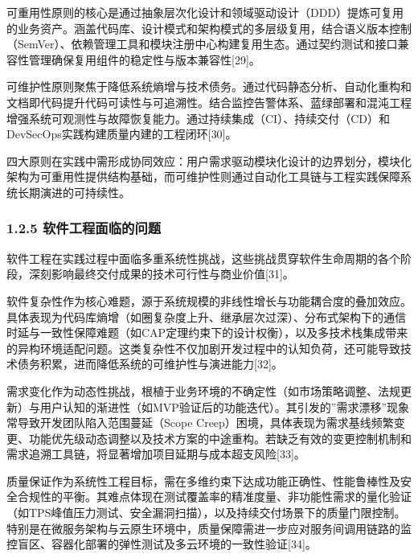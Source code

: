 可重用性原则的核心是通过抽象层次化设计和领域驱动设计（DDD）提炼可复用的业务资产。涵盖代码库、设计模式和架构模式的多层级复用，结合语义版本控制（SemVer）、依赖管理工具和模块注册中心构建复用生态。通过契约测试和接口兼容性管理确保复用组件的稳定性与版本兼容性{[}29{]}。


可维护性原则聚焦于降低系统熵增与技术债务。通过代码静态分析、自动化重构和文档即代码提升代码可读性与可追溯性。结合监控告警体系、蓝绿部署和混沌工程增强系统可观测性与故障恢复能力。通过持续集成（CI）、持续交付（CD）和DevSecOps实践构建质量内建的工程闭环{[}30{]}。

四大原则在实践中需形成协同效应：用户需求驱动模块化设计的边界划分，模块化架构为可重用性提供结构基础，而可维护性则通过自动化工具链与工程实践保障系统长期演进的可持续性。

\hypertarget{ux8f6fux4ef6ux5de5ux7a0bux9762ux4e34ux7684ux95eeux9898}{%
\subsubsection{1.2.5 软件工程面临的问题}\label{ux8f6fux4ef6ux5de5ux7a0bux9762ux4e34ux7684ux95eeux9898}}

软件工程在实践过程中面临多重系统性挑战，这些挑战贯穿软件生命周期的各个阶段，深刻影响最终交付成果的技术可行性与商业价值{[}31{]}。


软件复杂性作为核心难题，源于系统规模的非线性增长与功能耦合度的叠加效应。具体表现为代码库熵增（如圈复杂度上升、继承层次过深）、分布式架构下的通信时延与一致性保障难题（如CAP定理约束下的设计权衡），以及多技术栈集成带来的异构环境适配问题。这类复杂性不仅加剧开发过程中的认知负荷，还可能导致技术债务积累，进而降低系统的可维护性与演进能力{[}32{]}。


需求变化作为动态性挑战，根植于业务环境的不确定性（如市场策略调整、法规更新）与用户认知的渐进性（如MVP验证后的功能迭代）。其引发的''需求漂移''现象常导致开发团队陷入范围蔓延（Scope Creep）困境，具体表现为需求基线频繁变更、功能优先级动态调整以及技术方案的中途重构。若缺乏有效的变更控制机制和需求追溯工具链，将显著增加项目延期与成本超支风险{[}33{]}。


质量保证作为系统性工程目标，需在多维约束下达成功能正确性、性能鲁棒性及安全合规性的平衡。其难点体现在测试覆盖率的精准度量、非功能性需求的量化验证（如TPS峰值压力测试、安全漏洞扫描），以及持续交付场景下的质量门限控制。特别是在微服务架构与云原生环境中，质量保障需进一步应对服务间调用链路的监控盲区、容器化部署的弹性测试及多云环境的一致性验证{[}34{]}。

